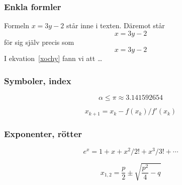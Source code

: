 \begin{frame}[fragile=singleslide]
  \frametitle{Enkla formler}
  \begin{mexempel}
    Formeln $x=3y-2$ står
    inne i texten. Däremot
    står
    \begin{displaymath}
      x=3y-2
    \end{displaymath}
    för sig själv precis som
    \begin{equation}
      x=3y-2
      \label{xochy}
    \end{equation}
    I ekvation~\ref{xochy} fann
    vi att \ldots
  \end{mexempel}
\end{frame}

\begin{frame}[fragile=singleslide]
  \frametitle{Symboler, index}
  \begin{mexempel}
    \begin{displaymath}
      \alpha \leq \pi \approx 3.141592654
    \end{displaymath}
  \end{mexempel}

  \vspace{1cm}

  \begin{mexempel}
    \begin{displaymath}
      x_{k+1}=x_{k}-f(x_{k})/f'(x_{k})
    \end{displaymath}
  \end{mexempel}
\end{frame}

\begin{frame}[fragile=singleslide]
  \frametitle{Exponenter, rötter}
  \begin{mexempel}
    \begin{displaymath}
      e^x = 1+x+x^2/2!+x^3/3!+\cdots
    \end{displaymath}
  \end{mexempel}

  \vspace{1cm}

  \begin{mexempel}
    \begin{displaymath}
      x_{1,2}=\frac{p}{2}\pm
      \sqrt{\frac{p^2}{4}-q}
    \end{displaymath}
  \end{mexempel}

\end{frame}



